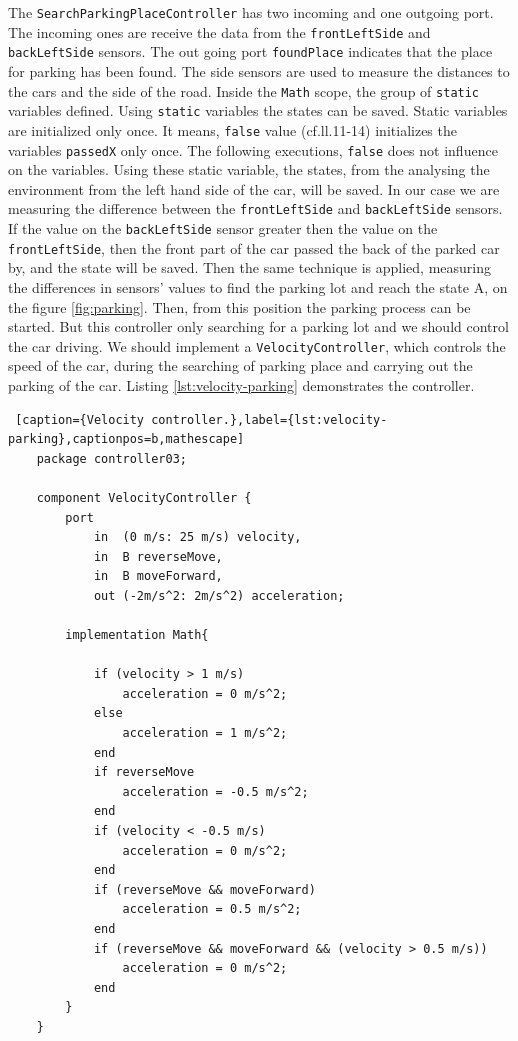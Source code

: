 The \texttt{SearchParkingPlaceController} has two incoming and one outgoing port. The incoming ones are receive the data from the \texttt{frontLeftSide} and \texttt{backLeftSide} sensors. The out going port \texttt{foundPlace} indicates that the place for parking has been found. The side sensors are used to measure the distances to the cars and the side of the road. Inside the \texttt{Math} scope, the group of \texttt{static} variables defined. Using \texttt{static} variables the states can be saved. Static variables are initialized only once. It means, \texttt{false} value (cf.ll.11-14) initializes the variables \texttt{passedX} only once. The following executions, \texttt{false} does not influence on the variables. Using these static variable, the states, from the analysing the environment from the left hand side of the car, will be saved. In our case we are measuring the difference between the \texttt{frontLeftSide} and \texttt{backLeftSide} sensors. If the value on the \texttt{backLeftSide} sensor greater then the value on the \texttt{frontLeftSide}, then the front part of the car passed the back of the parked car by, and the state will be saved. Then the same technique is applied, measuring the differences in sensors' values to find the parking lot and reach the state A, on the figure \ref{fig:parking}. Then, from this position the parking process can be started. But this controller only searching for a parking lot and we should control the car driving. We should implement a \texttt{VelocityController}, which controls the speed of the car, during the searching of parking place and carrying out the parking of the car. Listing \ref{lst:velocity-parking} demonstrates the controller. 
\bigskip
\begin{lstlisting} [caption={Velocity controller.},label={lst:velocity-parking},captionpos=b,mathescape]
    package controller03;

    component VelocityController {
        port                                    
            in  (0 m/s: 25 m/s) velocity,
            in  B reverseMove,
            in  B moveForward,
            out (-2m/s^2: 2m/s^2) acceleration; 
    
        implementation Math{                    
    
            if (velocity > 1 m/s)
                acceleration = 0 m/s^2;
            else
                acceleration = 1 m/s^2;
            end
            if reverseMove
                acceleration = -0.5 m/s^2;
            end
            if (velocity < -0.5 m/s)
                acceleration = 0 m/s^2;
            end
            if (reverseMove && moveForward)
                acceleration = 0.5 m/s^2;
            end
            if (reverseMove && moveForward && (velocity > 0.5 m/s))
                acceleration = 0 m/s^2;
            end
        }
    }
\end{lstlisting}
